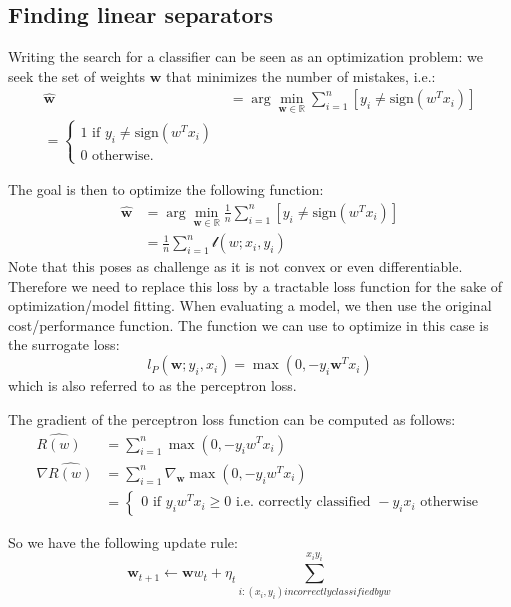 \documentclass[a4paper,10pt,twoside]{article}
\begin{document}
\subsection{Finding linear separators}

Writing the search for a classifier can be seen as an optimization problem:
we seek the set of weights $\mathbf{w}$ that minimizes the number of mistakes, i.e.:
\begin{align*}
    \hat{\mathbf{w}} &= \arg\min_{\mathbf{w}\in\mathbb{R}}\sum_{i=1}^{n}[y_i\neq \text{sign}(w^Tx_i)]\\
    =\begin{cases}
        1\text{ if } y_i\neq \text{sign}(w^Tx_i)\\
        0\text{ otherwise.}
    \end{cases}
\end{align*}

The goal is then to optimize the following function:
\begin{align*}
    \hat{\mathbf{w}} &= \arg\min_{\mathbf{w}\in\mathbb{R}}\frac{1}{n}\sum_{i=1}^{n}[y_i\neq \text{sign}(w^Tx_i)]\\
    &= \frac{1}{n}\sum_{i=1}^{n}\mathcal{l}(w; x_i,y_i)
\end{align*}
Note that this poses as challenge as it is not convex or even differentiable. Therefore we need to replace this loss by a tractable loss function for the sake of optimization/model fitting. When evaluating a model, we then use the original cost/performance function. The function we can use to optimize in this case is the surrogate loss:
\begin{equation*}
    l_P(\mathbf{w}; y_i, x_i) = \max (0, -y_i\mathbf{w}^Tx_i)
\end{equation*}
which is also referred to as the perceptron loss.

The gradient of the perceptron loss function can be computed as follows:
\begin{align*}
    \hat{R(w)}&=\sum_{i=1}^{n}\max (0, -y_iw^Tx_i)\\
    \nabla\hat{R(w)}&=\sum_{i=1}^{n}\nabla_{\mathbf{w}}\max (0, -y_iw^Tx_i)\\
    &=\begin{cases}
        0\text{ if } y_iw^Tx_i\geq 0 \text{ i.e. correctly classified }
        -y_ix_i\text{ otherwise}
    \end{cases}
\end{align*}

So we have the following update rule:
\begin{equation*}
    \mathbf{w}_{t+1} \leftarrow \mathbf{w}w_t+\eta_t\sum_{i:(x_i,y_i) {incorrectly classified by} w}^{x_iy_i}
\end{equation*}
\end{document}
